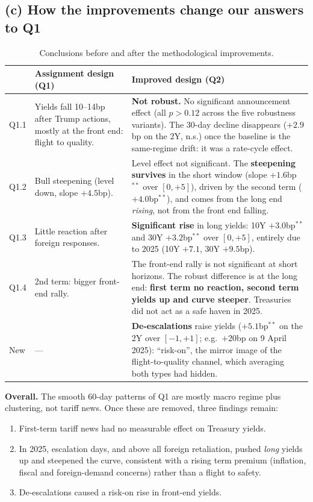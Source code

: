 \documentclass[11pt]{article}
\begin{document}
\subsection*{(c) How the improvements change our answers to Q1}

\begin{table}[h]
\centering
\footnotesize
\begin{tabular}{p{1.3cm}p{6.3cm}p{6.6cm}}
\toprule
 & Assignment design (Q1) & Improved design (Q2) \\
\midrule
Q1.1 & Yields fall 10--14bp after Trump actions, mostly at the front end:
flight to quality. & \textbf{Not robust.} No significant announcement effect
(all $p>0.12$ across the five robustness variants). The 30-day decline
disappears ($+2.9$bp on the 2Y, n.s.) once the baseline is the same-regime
drift: it was a rate-cycle effect. \\
\addlinespace
Q1.2 & Bull steepening (level down, slope $+4.5$bp). & Level effect not
significant. The \textbf{steepening survives} in the short window (slope
$+1.6$bp$^{**}$ over $[0,+5]$), driven by the second term ($+4.0$bp$^{**}$),
and comes from the long end \emph{rising}, not from the front end falling. \\
\addlinespace
Q1.3 & Little reaction after foreign responses. & \textbf{Significant
rise} in long yields: 10Y $+3.0$bp$^{**}$ and 30Y $+3.2$bp$^{**}$ over
$[0,+5]$, entirely due to 2025 (10Y $+7.1$, 30Y $+9.5$bp). \\
\addlinespace
Q1.4 & 2nd term: bigger front-end rally. & The front-end rally is not
significant at short horizons. The robust difference is at the long end:
\textbf{first term no reaction, second term yields up and curve steeper}.
Treasuries did not act as a safe haven in 2025. \\
\addlinespace
New & --- & \textbf{De-escalations} raise yields ($+5.1$bp$^{**}$ on the 2Y
over $[-1,+1]$; e.g.\ $+20$bp on 9 April 2025): ``risk-on'', the mirror image
of the flight-to-quality channel, which averaging both types had hidden. \\
\bottomrule
\end{tabular}
\caption{Conclusions before and after the methodological improvements.}
\end{table}

\textbf{Overall.} The smooth 60-day patterns of Q1 are mostly macro regime
plus clustering, not tariff news. Once these are removed, three findings
remain:
\begin{enumerate}[nosep]
\item First-term tariff news had no measurable effect on Treasury yields.
\item In 2025, escalation days, and above all foreign retaliation, pushed
\emph{long} yields up and steepened the curve, consistent with a rising term
premium (inflation, fiscal and foreign-demand concerns) rather than a flight
to safety.
\item De-escalations caused a risk-on rise in front-end yields.
\end{enumerate}
\end{document}
